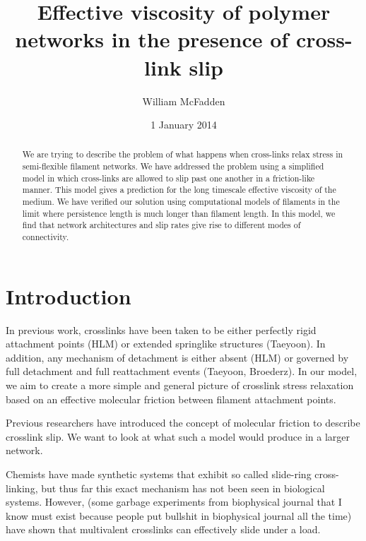 \documentclass[prb,11pt]{revtex4-1}
\begin{document}
\title{Effective viscosity of polymer networks in the presence of cross-link slip}
\author{William McFadden}

\date{1 January 2014}

\begin{abstract}
We are trying to describe the problem of what happens when cross-links relax stress in semi-flexible filament networks.  We have addressed the problem using a simplified model in which cross-links are allowed to slip past one another in a friction-like manner.  This model gives a prediction for the long timescale effective viscosity of the medium.  We have verified our solution using computational models of filaments in the limit where persistence length is much longer than filament length.  In this model, we find that network architectures and slip rates give rise to different modes of connectivity.
\end{abstract}

\maketitle

\section{Introduction}

In previous work, crosslinks have been taken to be either perfectly rigid attachment points (HLM) or extended springlike structures (Taeyoon).  In addition, any mechanism of detachment is either absent (HLM) or governed by full detachment and full reattachment events (Taeyoon, Broederz).  In our model, we aim to create a more simple and general picture of crosslink stress relaxation based on an effective molecular friction between filament attachment points.

Previous researchers have introduced the concept of molecular friction to describe crosslink slip.  We want to look at what such a model would produce in a larger network.

Chemists have made synthetic systems that exhibit so called slide-ring cross-linking, but thus far this exact mechanism has not been seen in biological systems.  However, (some garbage experiments from biophysical journal that I know must exist because people put bullshit in biophysical journal all the time) have shown that multivalent crosslinks can effectively slide under a load.
\end{document}
